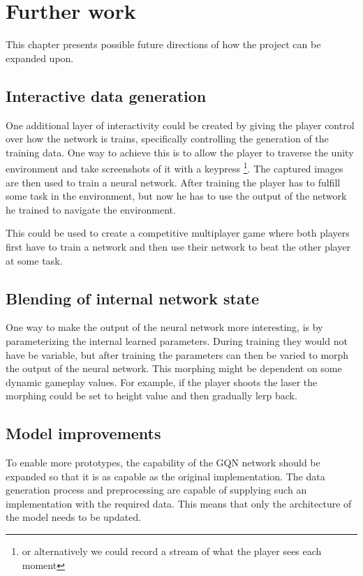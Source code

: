 
\chapter{Further work}\label{FurtherWork}
This chapter presents possible future directions of how the project can be expanded upon.


\section{Interactive data generation}
One additional layer of interactivity could be created by giving the player control over how the network is trains, specifically controlling the generation of the training data. One way to achieve this is to allow the player to traverse the unity environment and take screenshots of it with a keypress \footnote{or alternatively we could record a stream of what the player sees each moment}. The captured images are then used to train a neural network. After training the player has to fulfill some task in the environment, but now he has to use the output of the network he trained to navigate the environment.

This could be used to create a competitive multiplayer game where both players first have to train a network and then use their network to beat the other player at some task.


\section{Blending of internal network state}
One way to make the output of the neural network more interesting, is by parameterizing the internal learned parameters. During training they would not have be variable, but after training the parameters can then be varied to morph the output of the neural network. This morphing might be dependent on some dynamic gameplay values. For example, if the player shoots the laser the morphing could be set to height value and then gradually lerp back.


\section{Model improvements}
To enable more prototypes, the capability of the GQN network should be expanded so that it is as capable as the original implementation. The data generation process and preprocessing are capable of supplying such an implementation with the required data. This means that only the architecture of the model needs to be updated.

